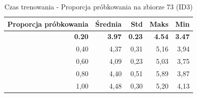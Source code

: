 \begin{table}[htbp]
\centering
\small
\setlength{\tabcolsep}{6pt}
\renewcommand{\arraystretch}{1.2}
\caption{Czas trenowania - Proporcja próbkowania na zbiorze 73 (ID3)}
\label{tab:ID3_sample_ratio_73_time}
\begin{tabular}{r|r|r|r|r}
\toprule
Proporcja próbkowania & Średnia & Std & Maks & Min \\
\hline
\textbf{0.20} & \textbf{3.97} & \textbf{0.23} & \textbf{4.54} & \textbf{3.47} \\
0,40 & 4,37 & 0,31 & 5,16 & 3,94 \\
0,60 & 4,09 & 0,23 & 5,03 & 3,75 \\
0,80 & 4,40 & 0,51 & 5,89 & 3,87 \\
1,00 & 4,48 & 0,30 & 5,20 & 4,13 \\
\bottomrule
\end{tabular}
\end{table}